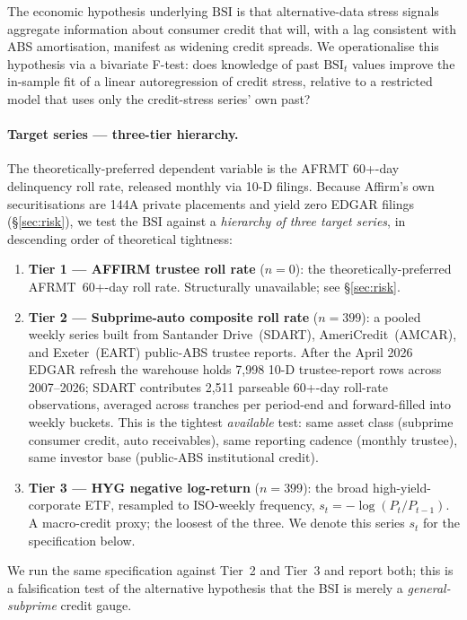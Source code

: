 \documentclass[11pt,letterpaper]{article}
\newcommand{\bsi}{\text{BSI}}
\begin{document}
The economic hypothesis underlying $\bsi$ is that alternative-data
stress signals aggregate information about consumer credit that will,
with a lag consistent with ABS amortisation, manifest as widening
credit spreads. We operationalise this hypothesis via a bivariate
\citet{granger1969investigating} F-test: does knowledge of past
$\bsi_t$ values improve the in-sample fit of a linear autoregression
of credit stress, relative to a restricted model that uses only the
credit-stress series' own past?

\paragraph{Target series — three-tier hierarchy.}
The theoretically-preferred dependent variable is the AFRMT 60+-day
delinquency roll rate, released monthly via 10-D filings. Because
Affirm's own securitisations are 144A private placements and yield
zero EDGAR filings (\S\ref{sec:risk}), we test the $\bsi$ against a
\emph{hierarchy of three target series}, in descending order of
theoretical tightness:
\begin{enumerate}[leftmargin=*,itemsep=2pt]
\item \textbf{Tier 1 --- AFFIRM trustee roll rate} ($n=0$): the
  theoretically-preferred AFRMT~60+-day roll rate. Structurally
  unavailable; see \S\ref{sec:risk}.
\item \textbf{Tier 2 --- Subprime-auto composite roll rate}
  ($n=399$): a pooled weekly series built from Santander
  Drive~(SDART), AmeriCredit~(AMCAR), and Exeter~(EART) public-ABS
  trustee reports. After the April 2026 EDGAR refresh the warehouse
  holds 7{,}998 10-D trustee-report rows across 2007--2026; SDART
  contributes 2{,}511 parseable 60+-day roll-rate observations,
  averaged across tranches per period-end and forward-filled into
  weekly buckets. This is the tightest \emph{available} test: same
  asset class (subprime consumer credit, auto receivables), same
  reporting cadence (monthly trustee), same investor base (public-ABS
  institutional credit).
\item \textbf{Tier 3 --- HYG negative log-return} ($n=399$): the
  broad high-yield-corporate ETF, resampled to ISO-weekly frequency,
  $s_t = -\log(P_t / P_{t-1})$. A macro-credit proxy; the loosest
  of the three. We denote this series $s_t$ for the specification
  below.
\end{enumerate}
We run the same specification against Tier~2 and Tier~3 and report
both; this is a falsification test of the alternative hypothesis
that the BSI is merely a \emph{general-subprime} credit gauge.
\end{document}
